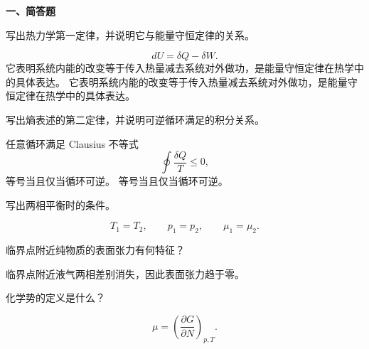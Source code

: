 ﻿


\textbf{一、简答题}
\begin{question}
写出热力学第一定律，并说明它与能量守恒定律的关系。
\begin{solution}

\[
dU=\delta Q-\delta W.
\]
它表明系统内能的改变等于传入热量减去系统对外做功，是能量守恒定律在热学中的具体表达。
它表明系统内能的改变等于传入热量减去系统对外做功，是能量守恒定律在热学中的具体表达。
\end{solution}
\end{question}

\begin{question}
写出熵表述的第二定律，并说明可逆循环满足的积分关系。
\begin{solution}

任意循环满足 Clausius 不等式
\[
\oint\frac{\delta Q}{T}\le0,
\]
等号当且仅当循环可逆。
等号当且仅当循环可逆。
\end{solution}
\end{question}

\begin{question}
写出两相平衡时的条件。
\begin{solution}

\[
T_1=T_2,\qquad p_1=p_2,\qquad \mu_1=\mu_2.
\]
\end{solution}
\end{question}

\begin{question}
临界点附近纯物质的表面张力有何特征？
\begin{solution}

临界点附近液气两相差别消失，因此表面张力趋于零。

\end{solution}
\end{question}

\begin{question}
化学势的定义是什么？
\begin{solution}

\[
\mu=\left(\frac{\partial G}{\partial N}\right)_{p,T}.
\]
\end{solution}
\end{question}

